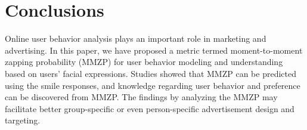 \documentclass[twoside,leqno,twocolumn]{article}
\begin{document}
\section{Conclusions}

Online user behavior analysis plays an important role in marketing and advertising. In this paper, we have proposed a metric termed moment-to-moment zapping probability (MMZP) for user behavior modeling and understanding based on users' facial expressions. Studies showed that MMZP can be predicted using the smile responses, and knowledge regarding user behavior and preference can be discovered from MMZP. The findings by analyzing the MMZP may facilitate better group-specific or even person-specific advertisement design and targeting. 




\end{document}
